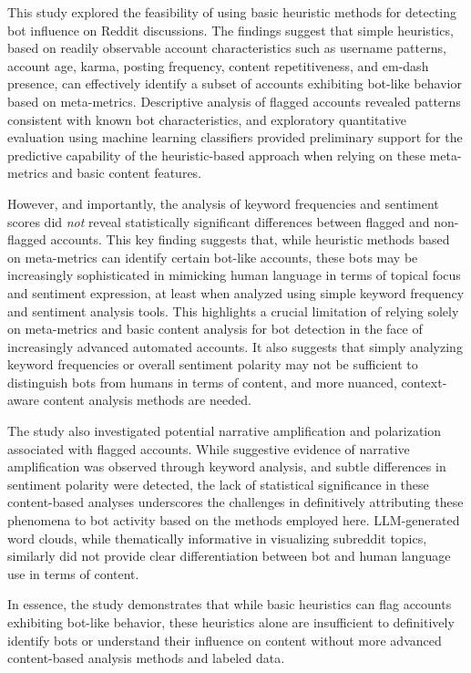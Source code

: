 \documentclass[
  12pt,
  letterpaper,
  DIV=11,
  numbers=noendperiod]{scrartcl}
\begin{document}
This study explored the feasibility of using basic heuristic methods for
detecting bot influence on Reddit discussions. The findings suggest that
simple heuristics, based on readily observable account characteristics
such as username patterns, account age, karma, posting frequency,
content repetitiveness, and em-dash presence, can effectively identify a
subset of accounts exhibiting bot-like behavior based on meta-metrics.
Descriptive analysis of flagged accounts revealed patterns consistent
with known bot characteristics, and exploratory quantitative evaluation
using machine learning classifiers provided preliminary support for the
predictive capability of the heuristic-based approach when relying on
these meta-metrics and basic content features.

However, and importantly, the analysis of keyword frequencies and
sentiment scores did \emph{not} reveal statistically significant
differences between flagged and non-flagged accounts. This key finding
suggests that, while heuristic methods based on meta-metrics can
identify certain bot-like accounts, these bots may be increasingly
sophisticated in mimicking human language in terms of topical focus and
sentiment expression, at least when analyzed using simple keyword
frequency and sentiment analysis tools. This highlights a crucial
limitation of relying solely on meta-metrics and basic content analysis
for bot detection in the face of increasingly advanced automated
accounts. It also suggests that simply analyzing keyword frequencies or
overall sentiment polarity may not be sufficient to distinguish bots
from humans in terms of content, and more nuanced, context-aware content
analysis methods are needed.

The study also investigated potential narrative amplification and
polarization associated with flagged accounts. While suggestive evidence
of narrative amplification was observed through keyword analysis, and
subtle differences in sentiment polarity were detected, the lack of
statistical significance in these content-based analyses underscores the
challenges in definitively attributing these phenomena to bot activity
based on the methods employed here. LLM-generated word clouds, while
thematically informative in visualizing subreddit topics, similarly did
not provide clear differentiation between bot and human language use in
terms of content.

In essence, the study demonstrates that while basic heuristics can flag
accounts exhibiting bot-like behavior, these heuristics alone are
insufficient to definitively identify bots or understand their influence
on content without more advanced content-based analysis methods and
labeled data.
\end{document}
